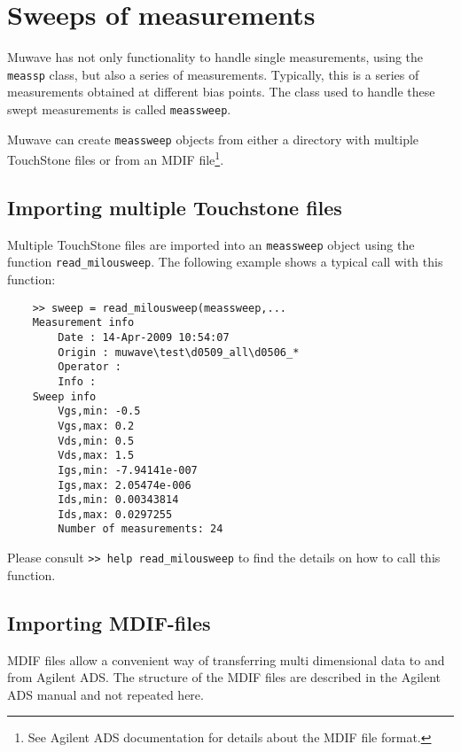 %
%

\section{Sweeps of measurements}\label{sec:sweeps}
Muwave has not only functionality to handle single measurements,
using the \verb"meassp" class, but also a series of measurements.
Typically, this is a series of measurements obtained at different
bias points. The class used to handle these swept measurements is
called \verb"meassweep".

Muwave can create \verb"meassweep" objects from either a directory
with multiple TouchStone files or from an MDIF file\footnote{See
Agilent ADS documentation for details about the MDIF file
format.}.

\subsection{Importing multiple Touchstone files}
Multiple TouchStone files are imported into an \verb"meassweep"
object using the function \verb"read_milousweep". The following
example shows a typical call with this function:
\begin{small}
\begin{verbatim}
    >> sweep = read_milousweep(meassweep,...
    Measurement info
        Date : 14-Apr-2009 10:54:07
        Origin : muwave\test\d0509_all\d0506_*
        Operator :
        Info :
    Sweep info
    	Vgs,min: -0.5
    	Vgs,max: 0.2
    	Vds,min: 0.5
    	Vds,max: 1.5
    	Igs,min: -7.94141e-007
    	Igs,max: 2.05474e-006
    	Ids,min: 0.00343814
    	Ids,max: 0.0297255
    	Number of measurements: 24
\end{verbatim}
\end{small}
Please consult \verb">> help read_milousweep" to find the details
on how to call this function.

\subsection{Importing MDIF-files}
MDIF files allow a convenient way of transferring multi
dimensional data to and from Agilent ADS. The structure of the
MDIF files are described in the Agilent ADS manual and not
repeated here.

